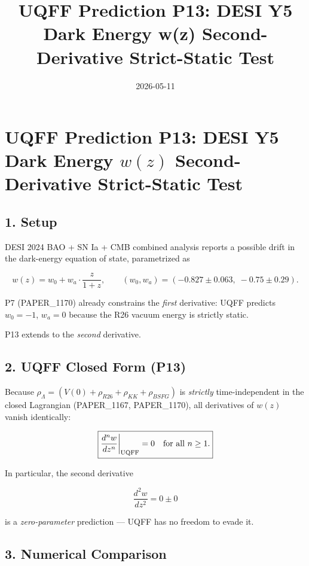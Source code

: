 \documentclass[
]{article}
\title{UQFF Prediction P13: DESI Y5 Dark Energy w(z) Second-Derivative
Strict-Static Test}
\author{}
\date{2026-05-11}
\begin{document}
\maketitle

\section{\texorpdfstring{UQFF Prediction P13: DESI Y5 Dark Energy
\(w(z)\) Second-Derivative Strict-Static
Test}{UQFF Prediction P13: DESI Y5 Dark Energy w(z) Second-Derivative Strict-Static Test}}\label{uqff-prediction-p13-desi-y5-dark-energy-wz-second-derivative-strict-static-test}

\subsection{1. Setup}\label{setup}

DESI 2024 BAO + SN Ia + CMB combined analysis reports a possible drift
in the dark-energy equation of state, parametrized as

\[
w(z) = w_0 + w_a \cdot \frac{z}{1 + z}, \qquad (w_0, w_a) = (-0.827 \pm 0.063,\; -0.75 \pm 0.29) .
\]

P7 (PAPER\_1170) already constrains the \emph{first} derivative: UQFF
predicts \(w_0 = -1\), \(w_a = 0\) because the R26 vacuum energy is
strictly static.

P13 extends to the \emph{second} derivative.

\subsection{2. UQFF Closed Form (P13)}\label{uqff-closed-form-p13}

Because \(\rho_\Lambda = (V(0) + \rho_{R26} + \rho_{KK} + \rho_{BSFG})\)
is \emph{strictly} time-independent in the closed Lagrangian
(PAPER\_1167, PAPER\_1170), all derivatives of \(w(z)\) vanish
identically:

\[
\boxed{\frac{d^n w}{dz^n}\bigg|_{\rm UQFF} = 0 \quad \text{for all } n \ge 1.}
\]

In particular, the second derivative

\[
\frac{d^2 w}{dz^2} = 0 \pm 0
\]

is a \emph{zero-parameter} prediction --- UQFF has no freedom to evade
it.

\subsection{3. Numerical Comparison}\label{numerical-comparison}
\end{document}
